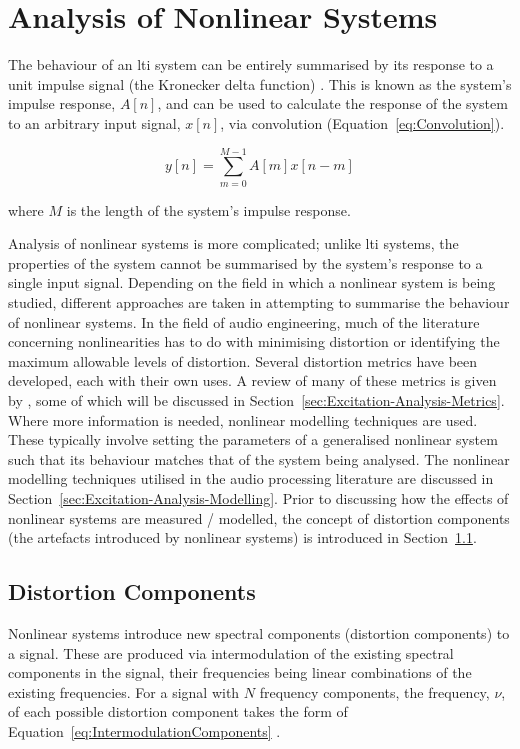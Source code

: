 \section{Analysis of Nonlinear Systems}
\label{sec:Excitation-AnalysisOfNonlinearSystems}
	The behaviour of an \acrshort{lti} system can be entirely summarised by its response to a unit impulse signal (the
	Kronecker delta function) \citep{phillips2007signals}. This is known as the system's impulse response, $A[n]$, and
	can be used to calculate the response of the system to an arbitrary input signal, $x[n]$, via convolution
	(Equation~\ref{eq:Convolution}).

	\begin{equation}
		y[n] = \sum_{m = 0}^{M - 1} A[m]x[n-m]
		\label{eq:Convolution}
	\end{equation}

	where $M$ is the length of the system's impulse response.
	
	Analysis of nonlinear systems is more complicated; unlike \acrshort{lti} systems, the properties of the system
	cannot be summarised by the system's response to a single input signal. Depending on the field in which a nonlinear
	system is being studied, different approaches are taken in attempting to summarise the behaviour of nonlinear
	systems. In the field of audio engineering, much of the literature concerning nonlinearities has to do with
	minimising distortion or identifying the maximum allowable levels of distortion. Several distortion metrics have
	been developed, each with their own uses. A review of many of these metrics is given by
	\citet{voishvillo2006assessment}, some of which will be discussed in Section~\ref{sec:Excitation-Analysis-Metrics}.
	Where more information is needed, nonlinear modelling techniques are used.  These typically involve setting the
	parameters of a generalised nonlinear system such that its behaviour matches that of the system being analysed. The
	nonlinear modelling techniques utilised in the audio processing literature are discussed in
	Section~\ref{sec:Excitation-Analysis-Modelling}. Prior to discussing how the effects of nonlinear systems are
	measured / modelled, the concept of distortion components (the artefacts introduced by nonlinear systems) is
	introduced in Section~\ref{sec:Excitation-Analysis-Components}.

	\subsection{Distortion Components}
	\label{sec:Excitation-Analysis-Components}
		Nonlinear systems introduce new spectral components (distortion components) to a signal. These are produced
		via intermodulation of the existing spectral components in the signal, their frequencies being linear
		combinations of the existing frequencies. For a signal with $N$ frequency components, the frequency, $\nu$,
		of each possible distortion component takes the form of Equation~\ref{eq:IntermodulationComponents}
		\citep{hulick2005solid}.

